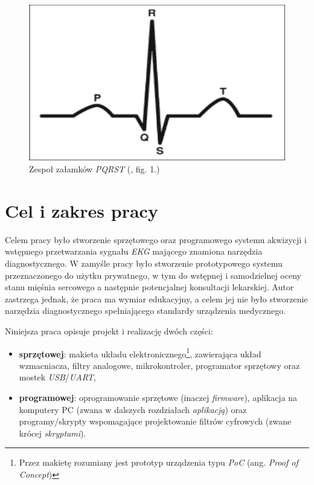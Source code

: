 \begin{figure}[h!]
    \centering
    \includegraphics[scale=0.6]{pl/media/pqrst.png}
    \caption{Zespoł załamków \textit{PQRST} (\cite{Limaye2016}, fig. 1.)}
    \label{fig:pqrst}
\end{figure}

\newpage

\section*{Cel i zakres pracy}

Celem pracy było stworzenie sprzętowego oraz programowego systemu akwizycji i wstępnego przetwarzania sygnału \textit{EKG} 
mającego znamiona narzędzia diagnostycznego. W zamyśle pracy było stworzenie prototypowego systemu przeznaczonego 
do użytku prywatnego, w tym do wstępnej i samodzielnej oceny stanu mięśnia sercowego a następnie
potencjalnej konsultacji lekarskiej.  
Autor zastrzega jednak, że praca ma wymiar edukacyjny, a celem jej nie było stworzenie narzędzia diagnostycznego spełniającego 
standardy urządzenia medycznego.


Niniejsza praca opisuje projekt i realizację dwóch części:

\begin{itemize}

    \item \textbf{sprzętowej}: makieta układu elektronicznego\footnote{Przez makietę rozumiany jest prototyp urządzenia typu 
    \textit{PoC} (ang. \textit{Proof of Concept})}, zawierająca układ wzmacniacza, filtry analogowe, 
    mikrokontroler, programator sprzętowy oraz mostek \textit{USB}/\textit{UART},


    \item \textbf{programowej}: oprogramowanie sprzętowe (inaczej \textit{firmware}), aplikacja na komputery PC 
    (zwana w dalszych rozdziałach \textit{aplikacją}) oraz programy/skrypty wspomagające projektowanie filtrów cyfrowych 
    (zwane krócej \textit{skryptami}).

\end{itemize}


